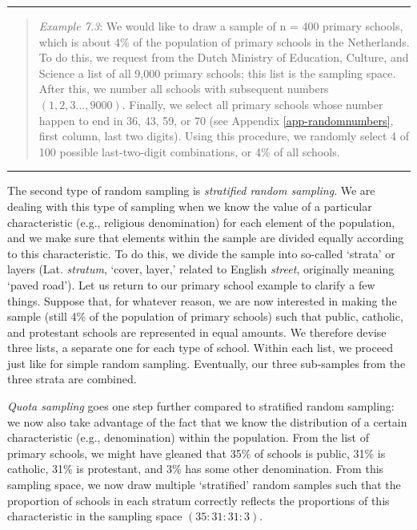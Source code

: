\documentclass[
]{book}
\begin{document}
\begin{center}\rule{0.5\linewidth}{0.5pt}\end{center}

\begin{quote}
\emph{Example 7.3}: We would like to draw a sample of n = 400 primary schools, which is about 4\% of the population of primary schools in the Netherlands. To do this, we request from the Dutch Ministry of Education, Culture, and Science a list of all 9,000 primary schools; this list is the sampling space. After this, we number all schools with subsequent numbers \((1, 2, 3 \ldots, 9000)\). Finally, we select all primary schools whose number happen to end in 36, 43, 59, or 70 (see Appendix \ref{app-randomnumbers}, first column, last two digits). Using this procedure, we randomly select 4 of 100 possible last-two-digit combinations, or 4\% of all schools.
\end{quote}

\begin{center}\rule{0.5\linewidth}{0.5pt}\end{center}

The second type of random sampling is \emph{stratified random sampling}. We are dealing with this type of sampling when we know the value of a particular characteristic (e.g., religious denomination) for each element of the population, and we make sure that elements within the sample are divided equally according to this characteristic. To do this, we divide the sample into so-called `strata' or layers (Lat. \emph{stratum}, `cover, layer,' related to English \emph{street}, originally meaning `paved road'). Let us return to our primary school example to clarify a few things. Suppose that, for whatever reason, we are now interested in making the sample (still 4\% of the population of primary schools) such that public, catholic, and protestant schools are represented in equal amounts. We therefore devise three lists, a separate one for each type of school. Within each list, we proceed just like for simple random sampling. Eventually, our three sub-samples from the three strata are combined.

\emph{Quota sampling} goes one step further compared to stratified random sampling: we now also take advantage of the fact that we know the distribution of a certain characteristic (e.g., denomination) within the population. From the list of primary schools, we might have gleaned that 35\% of schools is public, 31\% is catholic, 31\% is protestant, and 3\% has some other denomination. From this sampling space, we now draw multiple `stratified' random samples such that the proportion of schools in each stratum correctly reflects the proportions of this characteristic in the sampling space \((35 : 31 : 31 : 3)\).
\end{document}
